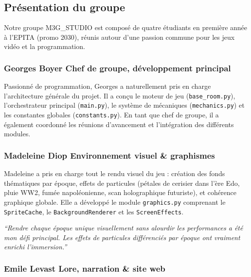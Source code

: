 \documentclass[12pt,a4paper]{article}
\begin{document}
\subsection{Présentation du groupe}

Notre groupe M3G\_STUDIO est composé de quatre étudiants en première année à l'EPITA (promo 2030), réunis autour d'une passion commune pour les jeux vidéo et la programmation.

\subsubsection*{Georges Boyer \textemdash{} Chef de groupe, développement principal}

Passionné de programmation, Georges a naturellement pris en charge l'architecture générale du projet. Il a conçu le moteur de jeu (\texttt{base\_room.py}), l'orchestrateur principal (\texttt{main.py}), le système de mécaniques (\texttt{mechanics.py}) et les constantes globales (\texttt{constants.py}). En tant que chef de groupe, il a également coordonné les réunions d'avancement et l'intégration des différents modules.

\subsubsection*{Madeleine Diop \textemdash{} Environnement visuel \& graphismes}

Madeleine a pris en charge tout le rendu visuel du jeu : création des fonds thématiques par époque, effets de particules (pétales de cerisier dans l'ère Edo, pluie WW2, fumée napoléonienne, scan holographique futuriste), et cohérence graphique globale. Elle a développé le module \texttt{graphics.py} comprenant le \texttt{SpriteCache}, le \texttt{BackgroundRenderer} et les \texttt{ScreenEffects}.

\begin{mdframed}[
  linecolor=rulegray,
  linewidth=0.8pt,
  backgroundcolor=rowaltbg,
  innerleftmargin=10pt,
  innerrightmargin=10pt,
  innertopmargin=6pt,
  innerbottommargin=6pt,
  roundcorner=3pt,
]
\textit{``Rendre chaque époque unique visuellement sans alourdir les performances a été mon défi principal. Les effets de particules différenciés par époque ont vraiment enrichi l'immersion.''}
\end{mdframed}

\subsubsection*{Emile Levast \textemdash{} Lore, narration \& site web}
\end{document}
